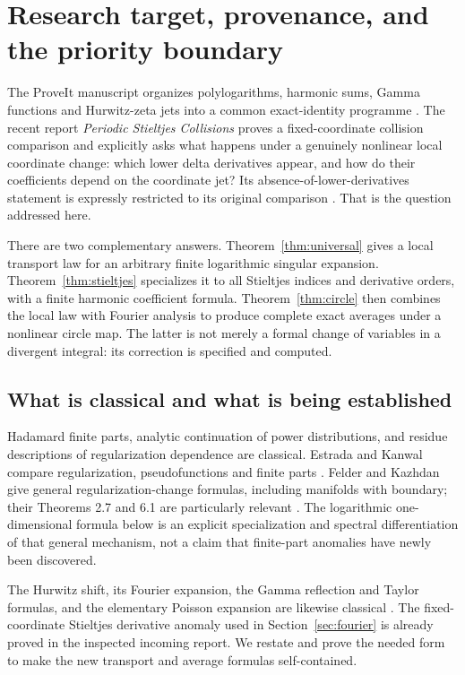 \documentclass[11pt]{article}
\theoremstyle{definition}\newtheorem{definition}[theorem]{Definition}
\theoremstyle{remark}\newtheorem{remark}[theorem]{Remark}
\begin{document}
\section{Research target, provenance, and the priority boundary}
\label{sec:scope}
The ProveIt manuscript organizes polylogarithms, harmonic sums, Gamma functions and Hurwitz-zeta jets into a common exact-identity programme \cite{repo}. The recent report \emph{Periodic Stieltjes Collisions} proves a fixed-coordinate collision comparison and explicitly asks what happens under a genuinely nonlinear local coordinate change: which lower delta derivatives appear, and how do their coefficients depend on the coordinate jet? Its absence-of-lower-derivatives statement is expressly restricted to its original comparison \cite{collisions}. That is the question addressed here.

There are two complementary answers. Theorem~\ref{thm:universal} gives a local transport law for an arbitrary finite logarithmic singular expansion. Theorem~\ref{thm:stieltjes} specializes it to all Stieltjes indices and derivative orders, with a finite harmonic coefficient formula. Theorem~\ref{thm:circle} then combines the local law with Fourier analysis to produce complete exact averages under a nonlinear circle map. The latter is not merely a formal change of variables in a divergent integral: its correction is specified and computed.

\subsection{What is classical and what is being established}
Hadamard finite parts, analytic continuation of power distributions, and residue descriptions of regularization dependence are classical. Estrada and Kanwal compare regularization, pseudofunctions and finite parts \cite{EK}. Felder and Kazhdan give general regularization-change formulas, including manifolds with boundary; their Theorems 2.7 and 6.1 are particularly relevant \cite{FK}. The logarithmic one-dimensional formula below is an explicit specialization and spectral differentiation of that general mechanism, not a claim that finite-part anomalies have newly been discovered.

The Hurwitz shift, its Fourier expansion, the Gamma reflection and Taylor formulas, and the elementary Poisson expansion are likewise classical \cite{DLMFH,DLMFG,DLMFL}. The fixed-coordinate Stieltjes derivative anomaly used in Section~\ref{sec:fourier} is already proved in the inspected incoming report. We restate and prove the needed form to make the new transport and average formulas self-contained.
\end{document}
